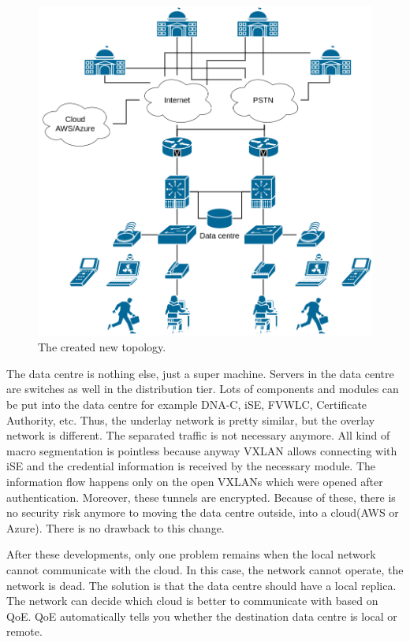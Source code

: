 \documentclass{article}
\begin{document}
\begin{figure}
\centering
\includegraphics[width=1\textwidth]{new_top.png}
\caption{\label{fig:new_top}The created new topology.}
\end{figure}

The data centre is nothing else, just a super machine. Servers in the data centre are switches as well in the distribution tier. Lots of components and modules can be put into the data centre for example DNA-C, iSE, FVWLC, Certificate Authority, etc. Thus, the underlay network is pretty similar, but the overlay network is different. The separated traffic is not necessary anymore. All kind of macro segmentation is pointless because anyway VXLAN allows connecting with iSE and the credential information is received by the necessary module. The information flow happens only on the open VXLANs which were opened after authentication. Moreover, these tunnels are encrypted. Because of these, there is no security risk anymore to moving the data centre outside, into a cloud(AWS or Azure). There is no drawback to this change.

After these developments, only one problem remains when the local network cannot communicate with the cloud. In this case, the network cannot operate, the network is dead. The solution is that the data centre should have a local replica. The network can decide which cloud is better to communicate with based on QoE. QoE automatically tells you whether the destination data centre is local or remote.
\end{document}
